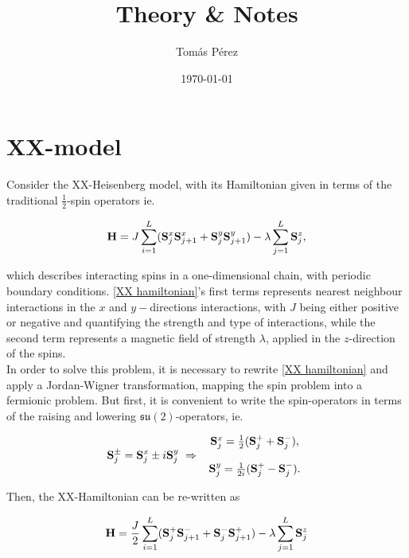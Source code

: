 \documentclass{homework}
\author{Tomás Pérez}
\date{\today}
\title{Theory \& Notes}
\begin{document}
 \maketitle

\section{XX-model}

Consider the XX-Heisenberg model, with its Hamiltonian given in terms of the traditional $\frac{1}{2}$-spin operators ie. 

\begin{equation}
    {\bf H} = J \sum_{i=1}^{L} ({\bf S}_{j}^{x} {\bf S}_{j+1}^{x} + {\bf S}_{j}^{y} {\bf S}_{j+1}^{y}) - \lambda \sum_{j=1}^{L} {\bf S}_{j}^{z},
    \label{XX hamiltonian}
\end{equation}

which describes interacting spins in a one-dimensional chain, with periodic boundary conditions. \eqref{XX hamiltonian}'s first terms represents nearest neighbour interactions in the $x$ and $y-$directions  interactions, with $J$ being either positive or negative and quantifying the strength and type of interactions, while the second term represents a magnetic field of strength $\lambda$, applied in the $z$-direction of the spins. \\

In order to solve this problem, it is necessary to rewrite \eqref{XX hamiltonian} and apply a Jordan-Wigner transformation, mapping the spin problem into a fermionic problem. But first, it is convenient to write the spin-operators in terms of the raising and lowering $\mathfrak{su}(2)$-operators, ie.

$$
    {\bf S}_j^{\pm} = {\bf S}_j^{x} \pm i {\bf S}_j^{y} \textnormal{ } \Rightarrow \textnormal{ } \begin{array}{c}
         {\bf S}_{j}^x = \frac{1}{2} ({\bf S}_j^+ + {\bf S}_j^-), \\
          \\
         {\bf S}_{j}^y = \frac{1}{2i} ({\bf S}_j^+ - {\bf S}_j^-). 
    \end{array}
$$

Then, the XX-Hamiltonian can be re-written as 

\begin{equation}
     {\bf H} = \frac{J}{2} \sum_{i=1}^{L} ({\bf S}_{j}^{+} {\bf S}_{j+1}^{-} + {\bf S}_{j}^{-} {\bf S}_{j+1}^{+}) - \lambda \sum_{j=1}^{L} {\bf S}_{j}^{z}
     \label{raising Hamiltonian}
\end{equation}
\end{document}
